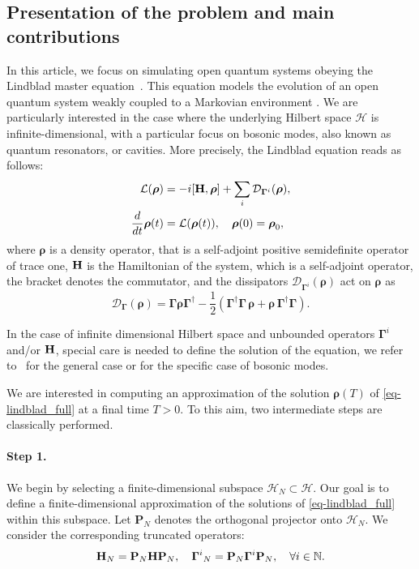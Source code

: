 \documentclass[a4paper,onecolumn,amsmath,amssymb,amsfonts,accepted=2026-03-06]{quantumarticle}
\newcommand{\xL}{\mathcal{L}}
\newcommand{\xH}{\mathcal{H}}
\newcommand{\xN}{\mathbb{N}}
\newcommand{\cD}{\mathcal D}
\newcommand{\LL}{{\mathbf{\Gamma}}}
\newcommand{\Hamil}{{\bf H}}
\newcommand{\Proj}[1]{\mathbf{P}_{#1}}
\begin{document}
\subsection{Presentation of the problem and main contributions}
In this article, we focus on simulating open quantum systems obeying the Lindblad master equation~\cite{lindbladGeneratorsQuantumDynamical1976, goriniCompletelyPositiveDynamical1976,gkls_history}. This equation models the evolution of an open quantum system weakly coupled to a Markovian environment \cite{breuerTheoryOpen2006}. We are particularly interested in the case where the underlying Hilbert space $\xH$ is infinite-dimensional, with a particular focus on bosonic modes, also known as quantum resonators, or cavities. 
More precisely, the Lindblad equation reads as follows:
\begin{align}
    \notag
    \xL(\boldsymbol{\rho})& =-i[\Hamil,\boldsymbol{\rho}] + \sum_i \cD_{\LL^i}(\boldsymbol{\rho}),  \\
    \frac{d}{dt} \boldsymbol{\rho}(t)&= \xL(\boldsymbol{\rho}(t)), \quad \boldsymbol{\rho}(0)=\boldsymbol{\rho}_0,
    \label{eq-lindblad_full}
\end{align}
where $\boldsymbol{\rho}$ is a density operator, that is a self-adjoint positive semidefinite operator of trace one, $\Hamil$ is the Hamiltonian of the system, which is a self-adjoint operator, the bracket denotes the commutator, and the dissipators $\cD_{\LL^i}(\boldsymbol{\rho})$ act on $\boldsymbol{\rho}$ as
\begin{equation}
	\cD_{\LL}(\boldsymbol{\rho})
	= \LL \boldsymbol{\rho} {\LL}^\dag - \frac12 \left( {\LL}^\dag\LL \, \boldsymbol{\rho} + \boldsymbol{\rho}\, {\LL}^\dag \LL\right).
    \label{eq-dissipator}
\end{equation}

In the case of infinite dimensional Hilbert space and unbounded operators $\LL^i$ and/or $\Hamil$, special care is needed to define the solution of the equation, we refer to~\cite{daviesGeneratorsDynamicalSemigroups1979,chebotarevSufficientConditionsConservativity1998} for the general case or \cite{gondolfEnergyPreservingEvolutions2023} for the specific case of bosonic modes.

We are interested in computing an approximation of the solution $\boldsymbol{\rho}(T)$ of \cref{eq-lindblad_full} at a final time $T>0$.
To this aim, two intermediate steps are classically performed.

\paragraph{Step 1.} We begin by selecting a finite-dimensional subspace $\xH_N \subset \xH$. Our goal is to define a finite-dimensional approximation of the solutions of \cref{eq-lindblad_full} within this subspace. Let $\Proj{N}$ denotes the orthogonal projector onto $\xH_N$. We consider the corresponding truncated operators:
\begin{align}
  \Hamil_N=\Proj{N} \Hamil \Proj{N},\quad {\LL^i}_N=\Proj{N} \LL^i \Proj{N}, \quad \forall i\in \xN.
\end{align}
\end{document}
